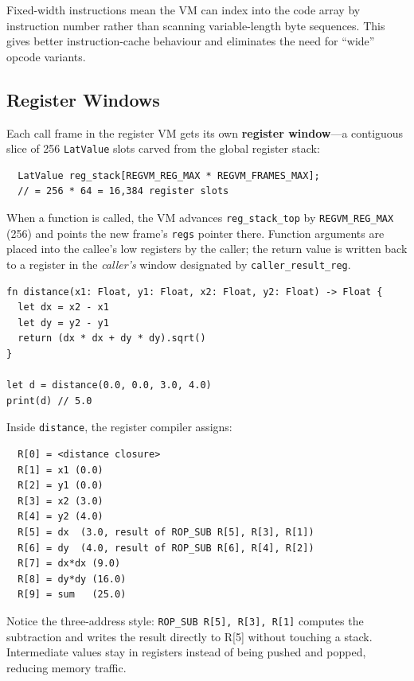 Fixed-width instructions mean the VM can index into the code array by
instruction number rather than scanning variable-length byte sequences. This
gives better instruction-cache behaviour and eliminates the need for ``wide''
opcode variants.

\subsection{Register Windows}\label{subsec:reg-windows}

Each call frame in the register VM gets its own \textbf{register window}---a
contiguous slice of 256 \lstinline|LatValue| slots carved from the global
register stack:

\begin{verbatim}
  LatValue reg_stack[REGVM_REG_MAX * REGVM_FRAMES_MAX];
  // = 256 * 64 = 16,384 register slots
\end{verbatim}

When a function is called, the VM advances \lstinline|reg_stack_top| by
\lstinline|REGVM_REG_MAX| (256) and points the new frame's \lstinline|regs|
pointer there. Function arguments are placed into the callee's low registers
by the caller; the return value is written back to a register in the
\emph{caller's} window designated by \lstinline|caller_result_reg|.

\begin{lstlisting}[language=Lattice, caption={Register allocation for a function call}]
fn distance(x1: Float, y1: Float, x2: Float, y2: Float) -> Float {
  let dx = x2 - x1
  let dy = y2 - y1
  return (dx * dx + dy * dy).sqrt()
}

let d = distance(0.0, 0.0, 3.0, 4.0)
print(d) // 5.0
\end{lstlisting}

Inside \lstinline|distance|, the register compiler assigns:

\begin{verbatim}
  R[0] = <distance closure>
  R[1] = x1 (0.0)
  R[2] = y1 (0.0)
  R[3] = x2 (3.0)
  R[4] = y2 (4.0)
  R[5] = dx  (3.0, result of ROP_SUB R[5], R[3], R[1])
  R[6] = dy  (4.0, result of ROP_SUB R[6], R[4], R[2])
  R[7] = dx*dx (9.0)
  R[8] = dy*dy (16.0)
  R[9] = sum   (25.0)
\end{verbatim}

Notice the three-address style: \lstinline|ROP_SUB R[5], R[3], R[1]| computes
the subtraction and writes the result directly to R[5] without touching a stack.
Intermediate values stay in registers instead of being pushed and popped,
reducing memory traffic.

